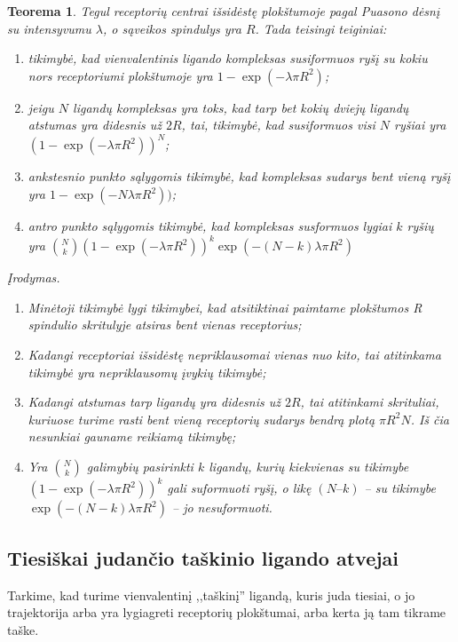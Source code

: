 \documentclass[10pt]{article}
\newtheorem{thm}{Teorema}
\begin{document}
\begin{thm}\label{thm:1}
Tegul receptorių centrai išsidėstę plokštumoje  pagal Puasono dėsnį su intensyvumu $\lambda$, o sąveikos spindulys yra $R$. Tada teisingi teiginiai:
\begin{enumerate}
	\item tikimybė, kad vienvalentinis ligando kompleksas susiformuos ryšį su kokiu nors receptoriumi plokštumoje yra $1-\exp(-\lambda \pi R^{2})$;
	\item jeigu $N$ ligandų kompleksas yra toks, kad tarp bet kokių dviejų ligandų atstumas  yra didesnis už $2R$, tai, tikimybė, kad susiformuos  visi $N$ ryšiai  yra $(1-\exp(-\lambda \pi R^{2}))^N$;
	\item ankstesnio punkto  sąlygomis  tikimybė, kad kompleksas  sudarys bent vieną ryšį yra 
	$1-\exp(-N \lambda \pi R^{2}))$;
	\item antro punkto sąlygomis tikimybė, kad kompleksas susformuos lygiai $k$ ryšių yra 
	 $ \binom{N}{k} \left( 1-\exp(-\lambda \pi R^{2}) \right) ^ k \exp(-(N-k) \lambda \pi R^{2})  $ 
	
	
	
\end{enumerate}
Įrodymas. 
\begin{enumerate}
\item  Minėtoji tikimybė lygi tikimybei, kad atsitiktinai paimtame plokštumos   R spindulio skritulyje atsiras bent vienas receptorius;
\item Kadangi receptoriai išsidėstę nepriklausomai vienas nuo kito, tai atitinkama tikimybė yra nepriklausomų įvykių tikimybė;
\item Kadangi atstumas tarp ligandų yra didesnis už $2R$, tai atitinkami skrituliai, kuriuose turime rasti bent vieną receptorių sudarys bendrą plotą $\pi R^2 N $. Iš čia nesunkiai gauname reikiamą tikimybę;
\item Yra  $\binom {N}{k}$ galimybių pasirinkti $k$ ligandų,  kurių kiekvienas su tikimybe $\left( 1-\exp(-\lambda \pi R^{2}) \right) ^ k$ gali suformuoti ryšį, o likę $( N – k )$ -- su tikimybe $\exp(-(N-k) \lambda \pi R^{2})$ -- jo nesuformuoti. 
\end{enumerate}


\end{thm}


\subsection{Tiesiškai judančio taškinio ligando atvejai}
Tarkime, kad turime vienvalentinį ,,taškinį'' ligandą, kuris juda tiesiai, o jo trajektorija arba yra lygiagreti receptorių plokštumai, arba kerta ją tam tikrame taške.
\end{document}
